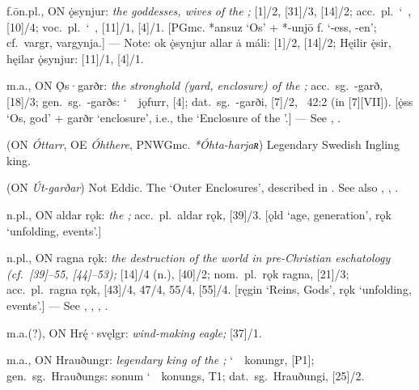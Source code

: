 \begin{itemize}
 f.ōn.pl., ON ǫ̇synjur:
  \emph{the goddesses, wives of the ;} [1]/2, [31]/3, [14]/2; acc.~pl.~\char`~, [10]/4; voc.~pl.~\char`~, [11]/1, [4]/1.
  [PGmc. *ansuz ‘Os’ + *-unjō f. ‘-ess, -en’; cf.~vargr, vargynja.]
  --- Note: ok ǫ̇synjur allar ȧ máli: [1]/2, [14]/2; Hęilir ę̇sir, hęilar ǫ̇synjur: [11]/1, [4]/1.

 m.a., ON Ǫ̇s·garðr:
  \emph{the stronghold (yard, enclosure) of the ;} acc.~sg.~-garð, [18]/3; gen.~sg.~-garðs: \char`~\ jǫfurr, [4]; dat.~sg.~-garði, [7]/2, \Skaldskaparmal\ 42:2 (in [7][VII]).
  [ǫ̇ss ‘Os, god’ + garðr ‘enclosure’, i.e., the ‘Enclosure of the ’.]
  --- See , .

 (ON \emph{Óttarr}, OE \emph{Óhthere}, PNWGmc. \emph{*Óhta-harjaʀ})
  Legendary Swedish Ingling king.

 (ON \emph{Út-garðar})
  Not Eddic.  The ‘Outer Enclosures’, described in \Gylfaginning. See also , , .

 n.pl., ON aldar rǫk:
  \emph{the ;} acc.~pl.~aldar rǫk, [39]/3.
  [ǫld ‘age, generation’, rǫk ‘unfolding, events’.]

 n.pl., ON ragna rǫk:
  \emph{the destruction of the world in pre-Christian eschatology (cf.~[39]--55, [44]--53);} [14]/4 (n.), [40]/2; nom.~pl.~rǫk ragna, [21]/3; acc.~pl.~ragna rǫk, [43]/4, 47/4, 55/4, [55]/4.
  [ręgin ‘Reins, Gods’, rǫk ‘unfolding, events’.]
  --- See , , , .

 m.a.(?), ON Hrę́·svęlgr:
  \emph{wind-making eagle;} [37]/1.

 m.a., ON Hrauðungr:
  \emph{legendary king of the ;} \char`~\ konungr, [P1]; gen.~sg.~Hrauðungs: sonum \char`~\ konungs,  T1; dat.~sg.~Hrauðungi, [25]/2.


\end{itemize}
